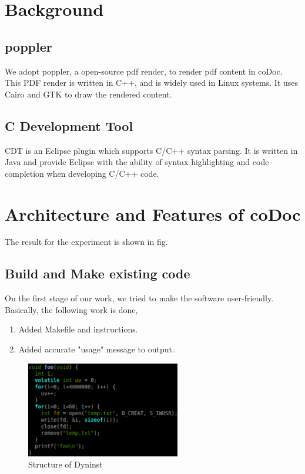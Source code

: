 \documentclass[11pt,letterpaper,oneside]{article}
\begin{document}
\section{Background}
\label{sec:background}
\subsection{poppler}
We adopt poppler, a open-source pdf render, to render pdf content in coDoc.
This PDF render is written in C++, 
and is widely used in Linux systems.
It uses Cairo and GTK to draw the rendered content.

\subsection{C Development Tool}
CDT is an Eclipse plugin which supports C/C++ syntax parsing.
It is written in Java and provide Eclipse with the ability of syntax highlighting and code completion when developing C/C++ code.


\section{Architecture and Features of coDoc}
\label{sec:arch}
The result for the experiment is shown in fig.

\subsection{Build and Make existing code}
On the first stage of our work, we tried to make the software user-friendly. Basically, the following work is done,
\begin{enumerate}
\item Added Makefile and instructions.
\item Added accurate "usage" message to output.
\end{enumerate}

\begin{figure}
\begin{center}
\includegraphics[width=0.6\textwidth]{codoc.eps}
\caption{Structure of Dyninst}
\label{fig:codoc}
\end{center}
\end{figure}
\end{document}
